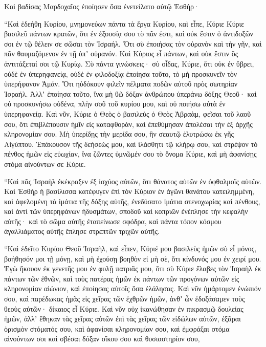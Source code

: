 {Καὶ βαδίσας Μαρδοχαῖος ἐποίησεν ὅσα ἐνετείλατο αὐτῷ Ἐσθήρ·
\par }{\PP {}“Καὶ ἐδεήθη Κυρίου, μνημονεύων πάντα τὰ ἔργα Κυρίου, καὶ εἶπε,
Κύριε Κύριε βασιλεῦ πάντων κρατῶν, ὅτι ἐν ἐξουσίᾳ σου τὸ πᾶν ἐστι, καὶ οὐκ ἔστιν ὁ ἀντιδοξῶν σοι ἐν τῷ θέλειν σε σῶσαι τὸν Ἰσραήλ.
Ὅτι σὺ ἐποιήσας τὸν οὐρανὸν καὶ τὴν γῆν, καὶ πᾶν θαυμαζόμενον ἐν τῇ ὑπʼ οὐρανόν. Καὶ Κύριος εἶ πάντων, καὶ οὐκ ἔστιν ὃς ἀντιτάξεταί σοι τῷ Κυρίῳ.
Σὺ πάντα γινώσκεις· σὺ οἶδας, Κύριε, ὅτι οὐκ ἐν ὕβρει, οὐδὲ ἐν ὑπερηφανείᾳ, οὐδὲ ἐν φιλοδοξίᾳ ἐποίησα τοῦτο, τὸ μὴ προσκυνεῖν τὸν ὑπερήφανον Ἀμάν. Ὅτι ηὐδόκουν φιλεῖν πέλματα ποδῶν αὐτοῦ πρὸς σωτηρίαν Ἰσραήλ.
Ἀλλʼ ἐποίησα τοῦτο, ἵνα μὴ θῶ δόξαν ἀνθρώπου ὑπεράνω δόξης Θεοῦ· καὶ οὐ προσκυνήσω οὐδένα, πλὴν σοῦ τοῦ κυρίου μου, καὶ οὐ ποιήσω αὐτὰ ἐν ὑπερηφανείᾳ.
Καὶ νῦν, Κύριε ὁ Θεὸς ὁ βασιλεὺς ὁ Θεὸς Ἀβραὰμ, φεῖσαι τοῦ λαοῦ σου, ὅτι ἐπιβλέπουσιν ἡμῖν εἰς καταφθορὰν, καὶ ἐπεθύμησαν ἀπολέσαι τὴν ἐξ ἀρχῆς κληρονομίαν σου.
Μὴ ὑπερίδῃς τὴν μερίδα σου, ἣν σεαυτῷ ἐλυτρώσω ἐκ γῆς Αἰγύπτου.
Ἐπάκουσον τῆς δεήσεώς μου, καὶ ἱλάσθητι τῷ κλήρῳ σου, καὶ στρέψον τὸ πένθος ἡμῶν εἰς εὐωχίαν, ἵνα ζῶντες ὑμνῶμέν σου τὸ ὄνομα Κύριε, καὶ μὴ ἀφανίσῃς στόμα αἰνούντων σε Κύριε.
\par }{\PP {}“Καὶ πᾶς Ἰσραὴλ ἐκέκραξεν ἐξ ἰσχύος αὐτῶν, ὅτι θάνατος αὐτῶν ἐν ὀφθαλμοῖς αὐτῶν.
Καὶ Ἐσθὴρ ἡ βασίλισσα κατέφυγεν ἐπὶ τὸν Κύριον ἐν ἀγῶνι θανάτου κατειλημμένη, καὶ ἀφελομένη τὰ ἱμάτια τῆς δόξης αὐτῆς, ἐνεδύσατο ἱμάτια στενοχωρίας καὶ πένθους, καὶ ἀντὶ τῶν ὑπερηφάνων ἡδυσμάτων, σποδοῦ καὶ κοπριῶν ἐνέπλησε τὴν κεφαλὴν αὐτῆς· καὶ τὸ σῶμα αὐτῆς ἐταπείνωσε σφόδρα, καὶ πάντα τόπον κόσμου ἀγαλλιάματος αὐτῆς ἔπλησε στρεπτῶν τριχῶν αὐτῆς.
\par }{\PP “Καὶ ἐδεῖτο Κυρίου Θεοῦ Ἰσραὴλ, καὶ εἶπεν,
Κύριέ μου βασιλεὺς ἡμῶν σὺ εἶ μόνος, βοήθησόν μοι τῇ μόνῃ, καὶ μὴ ἐχούσῃ βοηθὸν εἰ μὴ σὲ, ὅτι κίνδυνός μου ἐν χειρί μου.
Ἐγὼ ἤκουον ἐκ γενετῆς μου ἐν φυλῇ πατριᾶς μου, ὅτι σὺ Κύριε ἔλαβες τὸν Ἰσραὴλ ἐκ πάντων τῶν ἐθνῶν, καὶ τοὺς πατέρας ἡμῶν ἐκ πάντων τῶν προγόνων αὐτῶν εἰς κληρονομίαν αἰώνιον, καὶ ἐποίησας αὐτοῖς ὅσα ἐλάλησας.
Καὶ νῦν ἡμάρτομεν ἐνώπιόν σου, καὶ παρέδωκας ἡμᾶς εἰς χεῖρας τῶν ἐχθρῶν ἡμῶν, ἀνθʼ ὧν ἐδοξάσαμεν τοὺς θεοὺς αὐτῶν· δίκαιος εἶ Κύριε.
Καὶ νῦν οὐχ ἱκανώθησαν ἐν πικρασμῷ δουλείας ἡμῶν, ἀλλʼ ἔθηκαν τὰς χεῖρας αὐτῶν ἐπὶ τὰς χεῖρας τῶν εἰδώλων αὐτῶν, ἐξᾶραι ὁρισμὸν στόματός σου, καὶ ἀφανίσαι κληρονομίαν σου, καὶ ἐμφράξαι στόμα αἰνούντων σοι καὶ σβέσαι δόξαν οἴκου σου καὶ θυσιαστηρίον σου,
}
